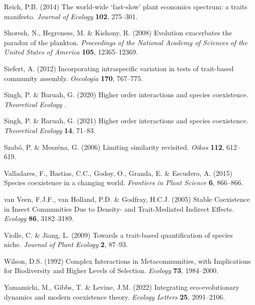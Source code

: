 \documentclass[11pt]{article}
\begin{document}
\begin{thebibliography}{51}
Reich, P.B. (2014) The world-wide ‘fast-slow’ plant economics spectrum: a
  traits manifesto. \emph{Journal of Ecology} \textbf{102}, 275--301.

Shoresh, N., Hegreness, M. \& Kishony, R. (2008) Evolution exacerbates the
  paradox of the plankton. \emph{Proceedings of the National Academy of
  Sciences of the United States of America} \textbf{105}, 12365--12369.

Siefert, A. (2012) Incorporating intraspecific variation in tests of
  trait-based community assembly. \emph{Oecologia} \textbf{170}, 767--775.

Singh, P. \& Baruah, G. (2020) Higher order interactions and species
  coexistence. \emph{Theoretical Ecology} .

Singh, P. \& Baruah, G. (2021) Higher order interactions and species
  coexistence. \emph{Theoretical Ecology} \textbf{14}, 71--83.

Szabó, P. \& Meszéna, G. (2006) Limiting similarity revisited. \emph{Oikos}
  \textbf{112}, 612--619.

Valladares, F., Bastias, C.C., Godoy, O., Granda, E. \& Escudero, A. (2015)
  Species coexistence in a changing world. \emph{Frontiers in Plant Science}
  \textbf{6}, 866--866.

van Veen, F.J.F., van Holland, P.D. \& Godfray, H.C.J. (2005) Stable
  {Coexistence} in {Insect} {Communities} {Due} to {Density}- and
  {Trait}-{Mediated} {Indirect} {Effects}. \emph{Ecology} \textbf{86},
  3182--3189.

Violle, C. \& Jiang, L. (2009) Towards a trait-based quantification of species
  niche. \emph{Journal of Plant Ecology} \textbf{2}, 87--93.

Wilson, D.S. (1992) Complex {Interactions} in {Metacommunities}, with
  {Implications} for {Biodiversity} and {Higher} {Levels} of {Selection}.
  \emph{Ecology} \textbf{73}, 1984--2000.

Yamamichi, M., Gibbs, T. \& Levine, J.M. (2022) Integrating eco-evolutionary
  dynamics and modern coexistence theory. \emph{Ecology Letters} \textbf{25},
  2091--2106.

\end{thebibliography}
\end{document}
